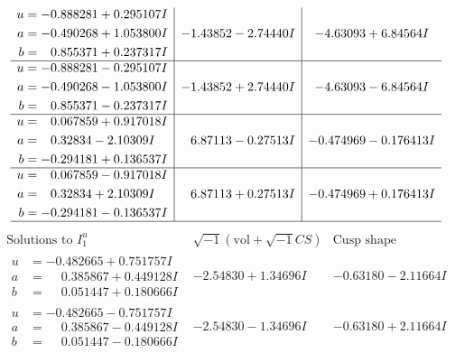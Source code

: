 \documentclass[1p]{elsarticle_modified}
\theoremstyle{definition}
\newcommand{\I}{\sqrt{-1}}
\begin{document}
$$\begin{array}{c|c|c}
\begin{aligned}
u &= -0.888281 + 0.295107 I \\
a &= -0.490268 + 1.053800 I \\
b &= \phantom{-}0.855371 + 0.237317 I\end{aligned}
 & -1.43852 - 2.74440 I & -4.63093 + 6.84564 I \\ \hline\begin{aligned}
u &= -0.888281 - 0.295107 I \\
a &= -0.490268 - 1.053800 I \\
b &= \phantom{-}0.855371 - 0.237317 I\end{aligned}
 & -1.43852 + 2.74440 I & -4.63093 - 6.84564 I \\ \hline\begin{aligned}
u &= \phantom{-}0.067859 + 0.917018 I \\
a &= \phantom{-}0.32834 - 2.10309 I \\
b &= -0.294181 + 0.136537 I\end{aligned}
 & \phantom{-}6.87113 - 0.27513 I & -0.474969 - 0.176413 I \\ \hline\begin{aligned}
u &= \phantom{-}0.067859 - 0.917018 I \\
a &= \phantom{-}0.32834 + 2.10309 I \\
b &= -0.294181 - 0.136537 I\end{aligned}
 & \phantom{-}6.87113 + 0.27513 I & -0.474969 + 0.176413 I\\
 \hline 
 \end{array}$$\newpage$$\begin{array}{c|c|c}  
\text{Solutions to }I^u_{1}& \I (\text{vol} + \sqrt{-1}CS) & \text{Cusp shape}\\
 \hline 
\begin{aligned}
u &= -0.482665 + 0.751757 I \\
a &= \phantom{-}0.385867 + 0.449128 I \\
b &= \phantom{-}0.051447 + 0.180666 I\end{aligned}
 & -2.54830 + 1.34696 I & -0.63180 - 2.11664 I \\ \hline\begin{aligned}
u &= -0.482665 - 0.751757 I \\
a &= \phantom{-}0.385867 - 0.449128 I \\
b &= \phantom{-}0.051447 - 0.180666 I\end{aligned}
 & -2.54830 - 1.34696 I & -0.63180 + 2.11664 I \\ \hline\begin{aligned}

\end{aligned}
\end{array}$$
\end{document}
